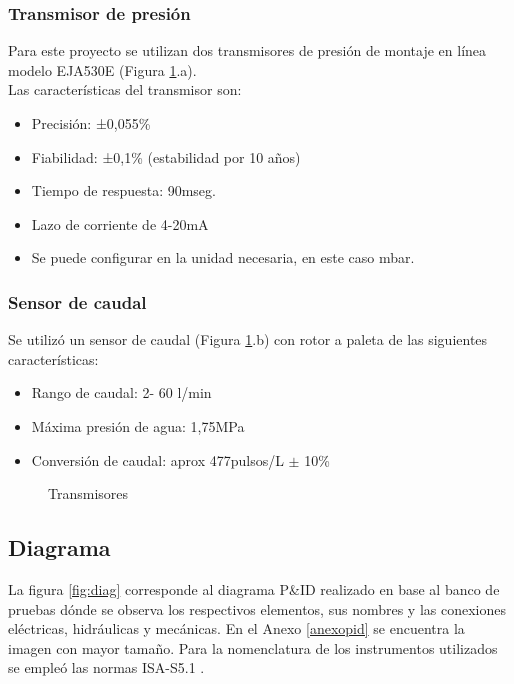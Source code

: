 \subsubsection{Transmisor de presión}
Para este proyecto se utilizan dos transmisores de presión de montaje en línea modelo EJA530E (Figura \ref{fig:transd}.a).\\
Las características del transmisor son:
\begin{itemize}
	\item Precisión: ±0,055\% 
	\item Fiabilidad: ±0,1\% (estabilidad por 10 años)
	\item Tiempo de respuesta: 90mseg.
	\item Lazo de corriente de 4-20mA
	\item Se puede configurar en la unidad necesaria, en este caso mbar.
\end{itemize}


\subsubsection{Sensor de caudal}
Se utilizó un sensor de caudal (Figura \ref{fig:transd}.b) con rotor a paleta de las siguientes características:
\begin{itemize}
	\item Rango de caudal: 2- 60 l/min
	\item Máxima presión de agua: 1,75MPa
	\item Conversión de caudal: aprox 477pulsos/L $\pm$ 10\%
\end{itemize}


\begin{figure}[htbp]
	\centering
	\caption{Transmisores} \label{fig:transd}
\end{figure}





\subsection{Diagrama}
La figura \ref{fig:diag} corresponde al diagrama P\&ID realizado en base al banco de pruebas dónde se observa los respectivos elementos, sus nombres y las conexiones eléctricas, hidráulicas y mecánicas. En el Anexo \ref{anexopid} se encuentra la imagen con mayor tamaño.
 Para la nomenclatura de los instrumentos utilizados se empleó las normas ISA-S5.1 \cite{ISA}. 

